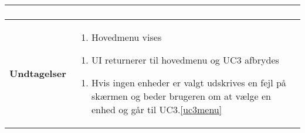 \begin{table}[H]
\begin{tabular}{|p{6cm}|p{8cm}|}
\begin{enumerate}
	\end{enumerate} \\ \hline

		\textbf{Undtagelser}	
		
		&\begin{enumerate}[label= \ref{uc3login}a.]
			\item Hovedmenu vises
		\end{enumerate}
						
		\begin{enumerate}[label= \ref{uc3deact}a.]
			\item UI returnerer til hovedmenu og UC3 afbrydes
		\end{enumerate}						
							
		\begin{enumerate}[label= \ref{uc3sysdeact}a.]
			\item Hvis ingen enheder er valgt udskrives en fejl på skærmen og beder brugeren om at vælge en enhed og går til UC3.\ref{uc3menu}
		\end{enumerate} \\\hline
											
		
	\end{tabular} 
\end{table}
